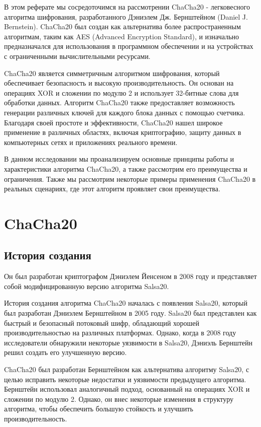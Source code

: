 \documentclass[12pt]{article}
\begin{document}
    В этом реферате мы сосредоточимся на рассмотрении ChaCha20 - легковесного алгоритма шифрования, разработанного Дэниэлем Дж. Бернштейном (Daniel J. Bernstein).
    ChaCha20 был создан как альтернатива более распространенным алгоритмам, таким как AES (Advanced Encryption Standard), и изначально предназначался для использования в программном обеспечении и на устройствах с ограниченными вычислительными ресурсами.

    ChaCha20 является симметричным алгоритмом шифрования, который обеспечивает безопасность и высокую производительность.
    Он основан на операциях XOR и сложении по модулю 2 и использует 32-битные слова для обработки данных.
    Алгоритм ChaCha20 также предоставляет возможность генерации различных ключей для каждого блока данных с помощью счетчика.
    Благодаря своей простоте и эффективности, ChaCha20 нашел широкое применение в различных областях, включая криптографию, защиту данных в компьютерных сетях и приложениях реального времени.

    В данном исследовании мы проанализируем основные принципы работы и характеристики алгоритма ChaCha20, а также рассмотрим его преимущества и ограничения.
    Также мы рассмотрим некоторые примеры применения ChaCha20 в реальных сценариях, где этот алгоритм проявляет свои преимущества.

    \newpage


    \section{ChaCha20}

    \subsection{История создания}
    Он был разработан криптографом Дэниэлем Йенсеном в 2008 году и представляет собой модифицированную версию алгоритма Salsa20.

    История создания алгоритма ChaCha20 началась с появления Salsa20, который был разработан Дэниэлем Бернштейном в 2005 году.
    Salsa20 был представлен как быстрый и безопасный потоковый шифр, обладающий хорошей производительностью на различных платформах.
    Однако, когда в 2008 году исследователи обнаружили некоторые уязвимости в Salsa20, Дэниэль Бернштейн решил создать его улучшенную версию.

    ChaCha20 был разработан Бернштейном как альтернатива алгоритму Salsa20, с целью исправить некоторые недостатки и уязвимости предыдущего алгоритма.
    Бернштейн использовал аналогичный подход, основанный на операциях XOR и сложении по модулю 2.
    Однако, он внес некоторые изменения в структуру алгоритма, чтобы обеспечить большую стойкость и улучшить производительность.
\end{document}
